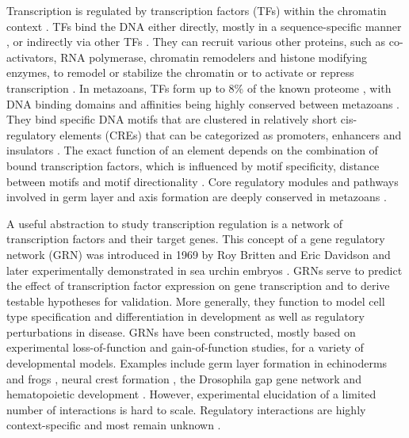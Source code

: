 Transcription is regulated by transcription factors (TFs) within the chromatin context \cite{Li_2004}. TFs bind the DNA either directly, mostly in a sequence-specific manner \cite{McMahon_1984}, or indirectly via other TFs \cite{Gord_n_2009}. They can recruit various other proteins, such as co-activators, RNA polymerase, chromatin remodelers and histone modifying enzymes, to remodel or stabilize the chromatin or to activate or repress transcription \cite{Chen_2021,Vaquerizas_2009}. In metazoans, TFs form up to 8\% of the known proteome \cite{Lambert_2018,Seb_Pedr_s_2018}, with DNA binding domains and affinities being highly conserved between metazoans \cite{Nitta_2015,Schmidt_2010,Villar_2014}. They bind specific DNA motifs that are clustered in relatively short cis-regulatory elements (CREs) that can be categorized as promoters, enhancers and insulators \cite{Levine_2005}. The exact function of an element depends on the combination of bound transcription factors, which is influenced by motif specificity, distance between motifs and motif directionality \cite{Avsec_2021,Brown_2007,Farley_2016,Wong_2020,Zeitlinger_2020}. Core regulatory modules and pathways involved in germ layer and axis formation are deeply conserved in metazoans \cite{Martindale_2005}.

A useful abstraction to study transcription regulation is a network of transcription factors and their target genes. This concept of a gene regulatory network (GRN) was introduced in 1969 by Roy Britten and Eric Davidson and later experimentally demonstrated in sea urchin embryos \cite{Britten_1969,Davidson_2002}. GRNs serve to predict the effect of transcription factor expression on gene transcription and to derive testable hypotheses for validation. More generally, they function to model cell type specification and differentiation in development as well as regulatory perturbations in disease. GRNs have been constructed, mostly based on experimental loss-of-function and gain-of-function studies, for a variety of developmental models. Examples include germ layer formation in echinoderms \cite{Cary_2020,Peter_2011,Saudemont_2010} and frogs \cite{Charney_2017,Koide_2005,Rankin_2011,Sinner_2006}, neural crest formation \cite{Lukoseviciute_2018,Williams_2019}, the Drosophila gap gene network \cite{Jaeger_2010} and hematopoietic development \cite{Kueh_2011,Pimanda_2010,Singh_2014}. However, experimental elucidation of a limited number of interactions is hard to scale. Regulatory interactions are highly context-specific \cite{Farley_2016,Ryan_2019} and most remain unknown \cite{Vaquerizas_2009,2012}.

